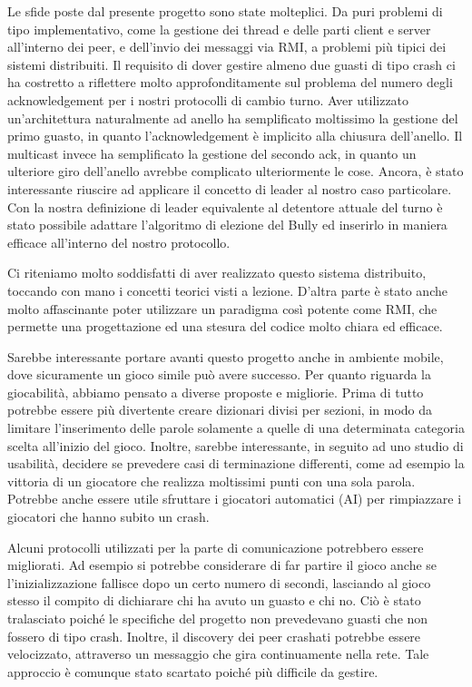 \documentclass[9pt]{article}
\begin{document}
Le sfide poste dal presente progetto sono state molteplici. Da puri problemi di tipo implementativo, come la gestione dei thread e delle parti client e server all'interno dei peer, e dell'invio dei messaggi via RMI, a problemi più tipici dei sistemi distribuiti. Il requisito di dover gestire almeno due guasti di tipo crash ci ha costretto a riflettere molto approfonditamente sul problema del numero degli acknowledgement per i nostri protocolli di cambio turno. Aver utilizzato un'architettura naturalmente ad anello ha semplificato moltissimo la gestione del primo guasto, in quanto l'acknowledgement è implicito alla chiusura dell'anello. Il multicast invece ha semplificato la gestione del secondo ack, in quanto un ulteriore giro dell'anello avrebbe complicato ulteriormente le cose.
Ancora, è stato interessante riuscire ad applicare il concetto di leader al nostro caso particolare. Con la nostra definizione di leader equivalente al detentore attuale del turno è stato possibile adattare l'algoritmo di elezione del Bully ed inserirlo in maniera efficace all'interno del nostro protocollo.

Ci riteniamo molto soddisfatti di aver realizzato questo sistema distribuito, toccando con mano i concetti teorici visti a lezione. D'altra parte è stato anche molto affascinante poter utilizzare un paradigma così potente come RMI, che permette una progettazione ed una stesura del codice molto chiara ed efficace.

Sarebbe interessante portare avanti questo progetto anche in ambiente mobile, dove sicuramente un gioco simile può avere successo. Per quanto riguarda la giocabilità, abbiamo pensato a diverse proposte e migliorie. Prima di tutto potrebbe essere più divertente creare dizionari divisi per sezioni, in modo da limitare l'inserimento delle parole solamente a quelle di una determinata categoria scelta all'inizio del gioco. Inoltre, sarebbe interessante, in seguito ad uno studio di usabilità, decidere se prevedere casi di terminazione differenti, come ad esempio la vittoria di un giocatore che realizza moltissimi punti con una sola parola. Potrebbe anche essere utile sfruttare i giocatori automatici (AI) per rimpiazzare i giocatori che hanno subito un crash.

Alcuni protocolli utilizzati per la parte di comunicazione potrebbero essere migliorati. Ad esempio si potrebbe considerare di far partire il gioco anche se l'inizializzazione fallisce dopo un certo numero di secondi, lasciando al gioco stesso il compito di dichiarare chi ha avuto un guasto e chi no. Ciò è stato tralasciato poiché le specifiche del progetto non prevedevano guasti che non fossero di tipo crash. Inoltre, il discovery dei peer crashati potrebbe essere velocizzato, attraverso un messaggio che gira continuamente nella rete. Tale approccio è comunque stato scartato poiché più difficile da gestire.





\end{document}
